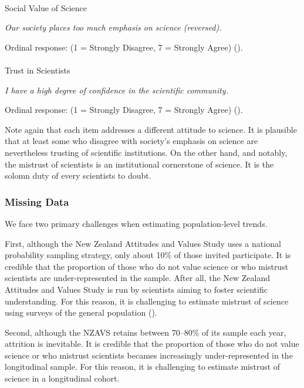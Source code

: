 \documentclass[
  single column]{article}
\makeatletter
\let\oldparagraph\paragraph
\renewcommand{\paragraph}{
    \@ifstar
      \xxxParagraphStar
      \xxxParagraphNoStar
  }
\newcommand{\xxxParagraphStar}[1]{\oldparagraph*{#1}\mbox{}}
\newcommand{\xxxParagraphNoStar}[1]{\oldparagraph{#1}\mbox{}}
\makeatother
\begin{document}
\paragraph{Social Value of Science}\label{social-value-of-science}

\emph{Our society places too much emphasis on science (reversed).}

Ordinal response: (1 = Strongly Disagree, 7 = Strongly Agree)
().

\paragraph{Trust in Scientists}\label{trust-in-scientists}

\emph{I have a high degree of confidence in the scientific community.}

Ordinal response: (1 = Strongly Disagree, 7 = Strongly Agree)
().

Note again that each item addresses a different attitude to science. It
is plausible that at least some who disagree with society's emphasis on
science are nevertheless trusting of scientific institutions. On the
other hand, and notably, the mistrust of scientists is an institutional
cornerstone of science. It is the solomn duty of every scientists to
doubt.

\subsubsection{Missing Data}\label{missing-data}

We face two primary challenges when estimating population-level trends.

First, although the New Zealand Attitudes and Values Study uses a
national probability sampling strategy, only about 10\% of those invited
participate. It is credible that the proportion of those who do not
value science or who mistrust scientists are under-represented in the
sample. After all, the New Zealand Attitudes and Values Study is run by
scientists aiming to foster scientific understanding. For this reason,
it is challenging to estimate mistrust of science using surveys of the
general population ().

Second, although the NZAVS retains between 70--80\% of its sample each
year, attrition is inevitable. It is credible that the proportion of
those who do not value science or who mistrust scientists becames
increasingly under-represented in the longitudinal sample. For this
reason, it is challenging to estimate mistrust of science in a
longitudinal cohort.
\end{document}
